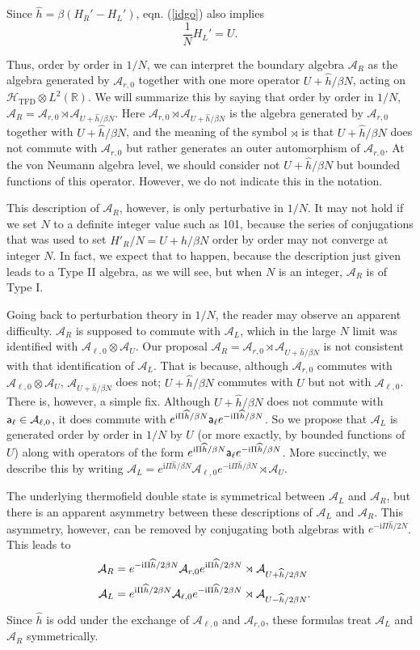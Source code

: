 \documentclass[11pt,a4paper]{article}
\def\a{{\sf a}}
\def\i{{\mathrm i}}
\def\be{\begin{equation}}
\def\ee{\end{equation}}
\def\h{\widehat}
\def\A{{\mathcal A}}
\def\R{{\mathbb R}}
\def\U{{ U}}
\def\h{\widehat}
\def\H{{\mathcal H}}
\def\TFD{{\mathrm{TFD}}}
\begin{document}
Since $\h h=\beta(H_R'-H_L')$, eqn. (\ref{idgo}) also implies
\be\label{widgo}\frac{1}{N}H_L'=U. \ee


Thus, order by order in $1/N$, we can interpret the boundary algebra $\A_R$ as the algebra generated by $\A_{r,0}$ together with one
more operator $\U+\h h /\beta N$, acting on $\H_\TFD\otimes L^2(\R)$.    
We will summarize this by saying that order by order in $1/N$,
$\A_R=\A_{r,0}\rtimes \A_{\U+\h h/\beta N}$.    Here $ \A_{r,0}\rtimes \A_{\U+\h h/\beta N}$ is the algebra generated by $\A_{r,0}$ together with ${\U+\h h/\beta N}$,
and the meaning of the  symbol $\rtimes$ is that $\U+\h h/\beta N$ does not commute with $\A_{r,0}$ but rather generates an outer automorphism of $\A_{r,0}$.   
 At the von Neumann algebra level, we should consider
not $\U+\h h/\beta N$ but bounded functions of this operator.  However, we do not indicate this in the notation.

This description of $\A_R$, however, is only perturbative in $1/N$.   It may not hold if we set $N$ to a definite integer value such as 101,
 because the series of conjugations that was used to set $H'_R/N=\U+\h h/\beta N$ order by order may not converge at integer $N$.  
In fact, we expect that to happen, because the description just given
 leads to a Type II algebra, as we will see, but when $N$ is an integer, $\A_R$ is of Type I.
 
 Going back to perturbation theory in $1/N$, the reader may observe an apparent difficulty.
 $\A_R$ is supposed to commute with $\A_L$, which in the large $N$ limit was identified with $\A_{\ell,0}\otimes \A_\U$.      Our proposal 
 $\A_R=\A_{r,0}\rtimes \A_{\U+\h h/\beta N}$ is not
 consistent with that identification of $\A_L$.   That is because, although $\A_{r,0}$ commutes with $\A_{\ell,0}\otimes \A_\U$, $\A_{\U+\h h/\beta N}$ does not;
 $\U+\h h/\beta N$ commutes with $\U$ but not with $\A_{\ell,0}$.   There is, however, a simple fix.   Although $\U+\h h/\beta N$ does not commute with $\a_{\ell}\in \A_{\ell,0}$,
 it does commute with $e^{\i\Pi \h h/\beta N}\a_\ell e^{-\i\Pi \h h/\beta N}$.   So we propose that $\A_L$ is generated order by order in $1/N$ by $\U$ (or more exactly,
 by bounded functions of $\U$) along with operators of the form  $e^{\i\Pi \h h/\beta N}\a_\ell e^{-\i\Pi \h h/\beta N}$.   More succinctly, we describe this by writing
 $\A_L=e^{\i\Pi \h h/\beta N}\A_{\ell,0} e^{-\i\Pi \h h/\beta N}\rtimes \A_\U$.   
 
The underlying thermofield double state is symmetrical between $\A_L$ and $\A_R$, but there is an  apparent asymmetry between these descriptions of $\A_L$ and $\A_R$.   This asymmetry, however, can be removed
 by conjugating both algebras with $e^{-\i \Pi \h h/2N}$.    This leads to  \begin{align}\label{elb}\A_R&= e^{-\i \Pi\h h/2\beta N}\A_{r,0} e^{\i \Pi\h h/2\beta N}\rtimes \A_{\U+\h h/2\beta N}\cr
 \A_L&=e^{\i\Pi\h h/2\beta N}\A_{\ell,0} e^{-\i \Pi \h h/2\beta N}\rtimes \A_{\U-\h h/2\beta N}.\end{align}   Since  $\h h$ is odd under the exchange of $\A_{\ell,0}$ and $\A_{r,0}$, these formulas
 treat $\A_L$ and $\A_R$ symmetrically.
 
\end{document}
